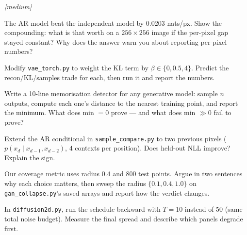 \emph{[medium]}
\begin{exercise}
The AR model beat the independent model by $0.0203$ nats/px. Show
the compounding: what is that worth on a $256{\times}256$ image if the
per-pixel gap stayed constant? Why does the answer warn you about
reporting per-pixel numbers?
\end{exercise}
\begin{exercise}
Modify \texttt{vae\_torch.py} to weight the KL term by
$\beta \in \{0, 0.5, 4\}$. Predict the recon/KL/samples trade for each,
then run it and report the numbers.
\end{exercise}
\begin{exercise}
Write a 10-line memorisation detector for any generative model:
sample $n$ outputs, compute each one's distance to the nearest
training point, and report the minimum. What does min $= 0$ prove ---
and what does min $\gg 0$ fail to prove?
\end{exercise}
\begin{exercise}
Extend the AR conditional in \texttt{sample\_compare.py} to two
previous pixels ($p(x_d \mid x_{d-1}, x_{d-2})$, $4$ contexts per
position). Does held-out NLL improve? Explain the sign.
\end{exercise}
\begin{exercise}
Our coverage metric uses radius $0.4$ and 800 test points. Argue in
two sentences why each choice matters, then sweep the radius
$\{0.1, 0.4, 1.0\}$ on \texttt{gan\_collapse.py}'s saved arrays and
report how the verdict changes.
\end{exercise}
\begin{exercise}
In \texttt{diffusion2d.py}, run the schedule backward with $T{=}10$
instead of $50$ (same total noise budget). Measure the final spread
and describe which panels degrade first.
\end{exercise}

